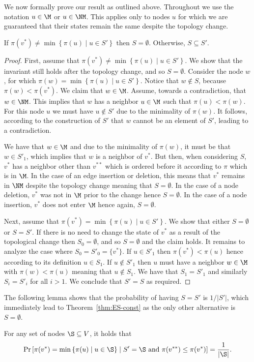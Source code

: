 We now formally prove our result as outlined above. Throughout we use the notation $u \in \M$ or $u \in \NM$. This applies only to nodes $u$ for which we are guaranteed that their states remain the same despite the topology change.
\begin{lem}
\label{lem:SandS'}
If $\pi(v^*)\neq\min\left\{ \pi(u)\mid u\in S'\right\} $ then $S=\emptyset$. Otherwise, $S\subseteq S'$.
\end{lem}
\begin{proof}
First, assume that $\pi(v^*)\neq\min\left\{ \pi(u)\mid u\in S'\right\}$. We show that the \MIS invariant still holds after the topology change, and so $S=\emptyset$.
Consider the node $w$, for which $\pi(w)=\min\left\{ \pi(u)\mid u\in S'\right\}$. Notice that $w\not\in S$, because $\pi(w) < \pi(v^*)$. We claim that $w \in \M$. Assume, towards a contradiction, that $w \in \NM$. This implies that $w$ has a neighbor $u \in \M$ such that $\pi(u) < \pi(w)$. For this node $u$ we must have $u \notin S'$ due to the minimality of $\pi(w)$. It follows, according to the construction of $S'$ that $w$ cannot be an element of $S'$, leading to a contradiction.

We have that $w \in \M$ and due to the minimality of $\pi(w)$, it must be that $w \in S'_1$, which implies that $w$ is a neighbor of $v^*$. But then, when considering $S$, $v^*$ has a neighbor other than $v^{**}$ which is ordered before it according to $\pi$ which is in $\M$. In the case of an edge insertion or deletion, this means that $v^{*}$ remains in $\NM$ despite the topology change meaning that $S=\emptyset$. In the case of a node deletion, $v^*$ was not in $\M$ prior to the change hence $S=\emptyset$. In the case of a node insertion, $v^*$ does not enter $\M$ hence again, $S=\emptyset$.

Next, assume that $\pi(v^*)=\min\left\{ \pi(u)\mid u\in S'\right\}$. We show that either $S=\emptyset$ or $S=S'$.
If there is no need to change the state of $v^*$ as a result of the topological change then $S_0=\emptyset$, and so $S=\emptyset$ and the claim holds. It remains to analyze the case where $S_0=S'_0=\{v^*\}$. 
If $u \in S'_1$ then $\pi(v^*) < \pi(u)$ hence according to its definition $u \in S_1$. If $u \notin S'_1$ then $u$ must have a neighbor $w \in \M$ with $\pi(w)<\pi(u)$ meaning that $u \notin S_1$. We have that $S_1=S'_1$ and similarly $S_i=S'_i$ for all $i >1$. We conclude that $S'=S$ as required.
\end{proof}

The following lemma shows that the probability of having $S=S'$ is $1/|S'|$, which immediately lead to Theorem~\ref{thm:ES-const} as the only other alternative is $S=\emptyset$. \begin{lem}
\label{lem:one-over-P}
For any set of nodes $\S\subseteq V$, it holds that $$\Pr\left[\pi(v^*)=\min\left\{ \pi(u)\mid u\in \S\right\} \mid S'=\S \mbox{ and } \pi(v^{**})\leq\pi(v^{*}) \right]=\frac{1}{|\S|}.$$
\end{lem}


